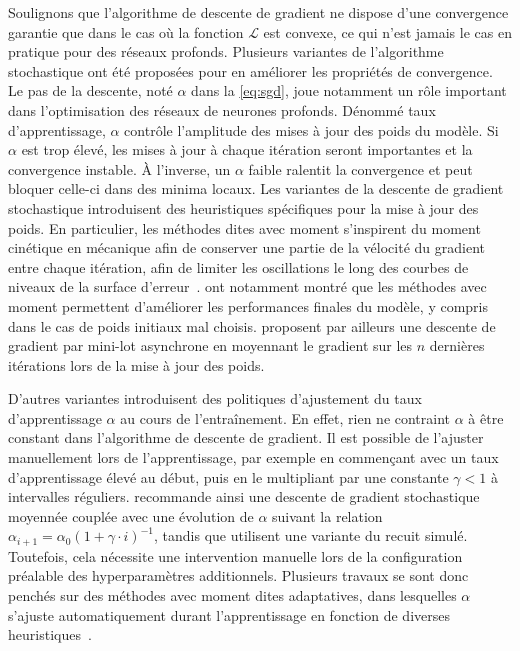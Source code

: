 Soulignons que l'algorithme de descente de gradient ne dispose d'une convergence garantie que dans le cas où la fonction $\mathcal{L}$ est convexe, ce qui n'est jamais le cas en pratique pour des réseaux profonds. Plusieurs variantes de l'algorithme stochastique ont été proposées pour en améliorer les propriétés de convergence. Le pas de la descente, noté $\alpha$ dans la \cref{eq:sgd}, joue notamment un rôle important dans l'optimisation des réseaux de neurones profonds. Dénommé taux d'apprentissage, $\alpha$ contrôle l'amplitude des mises à jour des poids du modèle. Si $\alpha$ est trop élevé, les mises à jour à chaque itération seront importantes et la convergence instable. À l'inverse, un $\alpha$ faible ralentit la convergence et peut bloquer celle-ci dans des minima locaux. Les variantes de la descente de gradient stochastique introduisent des heuristiques spécifiques pour la mise à jour des poids. En particulier, les méthodes dites avec \og moment \fg s'inspirent du moment cinétique en mécanique afin de conserver une partie de la vélocité du gradient entre chaque itération, afin de limiter les oscillations le long des courbes de niveaux de la surface d'erreur~\cite{qian_momentum_1999,nesterov_method_1983}. \citet{sutskever_importance_2013} ont notamment montré que les méthodes avec moment permettent d'améliorer les performances finales du modèle, y compris dans le cas de poids initiaux mal choisis. \citet{polyak_acceleration_1992} proposent par ailleurs une descente de gradient par mini-lot asynchrone en moyennant le gradient sur les $n$ dernières itérations lors de la mise à jour des poids.

D'autres variantes introduisent des politiques d'ajustement du taux d'apprentissage $\alpha$ au cours de l'entraînement. En effet, rien ne contraint $\alpha$ à être constant dans l'algorithme de descente de gradient. Il est possible de l'ajuster manuellement lors de l'apprentissage, par exemple en commençant avec un taux d'apprentissage élevé au début, puis en le multipliant par une constante $\gamma < 1$ à intervalles réguliers. \citet{bottou_stochastic_2012} recommande ainsi une descente de gradient stochastique moyennée couplée avec une évolution de $\alpha$ suivant la relation $\alpha_{i+1} = \alpha_0 (1 + \gamma \cdot i)^{-1}$, tandis que \citet{loshchilov_sgdr_2016} utilisent une variante du recuit simulé. Toutefois, cela nécessite une intervention manuelle lors de la configuration préalable des hyperparamètres additionnels. Plusieurs travaux se sont donc penchés sur des méthodes avec moment dites adaptatives, dans lesquelles $\alpha$ s'ajuste automatiquement durant l'apprentissage en fonction de diverses heuristiques~\cite{duchi_adaptive_2011,tielman_lecture_2012,zeiler_adadelta_2012,kingma_adam_2014}.

